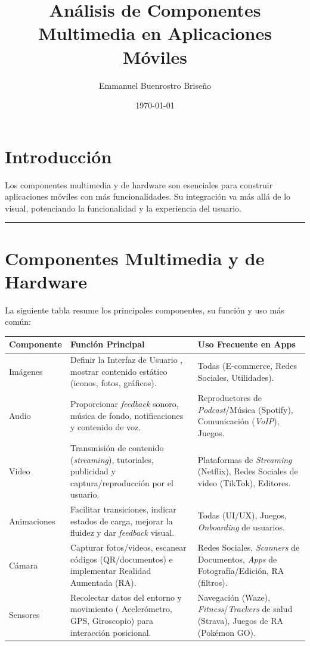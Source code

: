 \documentclass{article}
\title{ {Análisis de Componentes Multimedia en Aplicaciones Móviles}}
\author{Emmanuel Buenrostro Briseño}
\date{\today}
\begin{document}
\maketitle

\section{Introducción}
Los componentes multimedia y de hardware son esenciales para construir aplicaciones móviles con más funcionalidades. Su integración va más allá de lo visual, potenciando la funcionalidad y la experiencia del usuario. 

\hrule

\section{Componentes Multimedia y de Hardware}

La siguiente tabla resume los principales componentes, su función y uso más común:
\newpage
\begin{table}[h]
    \centering
    
    \begin{tabular}{|p{2.5cm}|p{5cm}|p{6cm}|}
        \toprule
         {Componente} &  {Función Principal} &  {Uso Frecuente en Apps} \\
        \midrule
         {Imágenes} & Definir la Interfaz de Usuario , mostrar contenido estático (iconos, fotos, gráficos). & Todas (E-commerce, Redes Sociales, Utilidades). \\
        \midrule
         {Audio} & Proporcionar \textit{feedback} sonoro, música de fondo, notificaciones y contenido de voz. & Reproductores de \textit{Podcast}/Música (Spotify), Comunicación (\textit{VoIP}), Juegos. \\
        \midrule
         {Video} & Transmisión de contenido (\textit{streaming}), tutoriales, publicidad y captura/reproducción por el usuario. & Plataformas de \textit{Streaming} (Netflix), Redes Sociales de video (TikTok), Editores. \\
        \midrule
         {Animaciones} & Facilitar transiciones, indicar estados de carga, mejorar la fluidez y dar \textit{feedback} visual. &  {Todas} (UI/UX), Juegos, \textit{Onboarding} de usuarios. \\
        \midrule
         {Cámara} & Capturar fotos/videos, escanear códigos (QR/documentos) e implementar  {Realidad Aumentada (RA)}. & Redes Sociales, \textit{Scanners} de Documentos, \textit{Apps} de Fotografía/Edición, RA (filtros). \\
        \midrule
         {Sensores} & Recolectar datos del entorno y movimiento ( {Acelerómetro, GPS, Giroscopio}) para interacción posicional. & Navegación (Waze), \textit{Fitness}/\textit{Trackers} de salud (Strava), Juegos de RA (Pokémon GO). \\
        \bottomrule
    \end{tabular}
\end{table}
\end{document}
